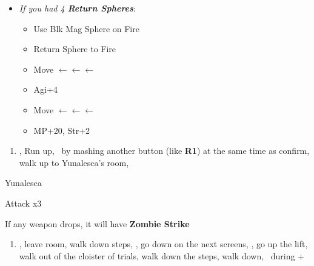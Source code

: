 \begin{spheregrid}
    \begin{itemize}
        \item \textit{If you had 4 \textbf{Return Spheres}}:
            \begin{itemize}
                \item Use Blk Mag Sphere on Fire
                \item Return Sphere to Fire
                \item Move $\leftarrow\leftarrow\leftarrow$
                \item Agi+4
                \item Move $\leftarrow\leftarrow\leftarrow$
                \item MP+20, Str+2
            \end{itemize}
    \end{itemize}
\end{spheregrid}
\begin{enumerate}[resume]
    \item \save, Run up, \sd\ by mashing another button (like \textbf{R1}) at the same time as confirm, walk up to Yunalesca's room, \sd
\end{enumerate}
\begin{battle}[132000]{Yunalesca}
    \begin{itemize}
        \summon{\bahamut}
        \bahamutf Attack x3
    \end{itemize}
    If any weapon drops, it will have \textbf{Zombie Strike}
\end{battle}
\begin{enumerate}[resume]
    \item \sd, leave room, walk down steps, \sd, go down on the next screens, \save, go up the lift, walk out of the cloister of trials, walk down the steps, walk down, \sd\ during \cs+\skippablefmv
\end{enumerate}